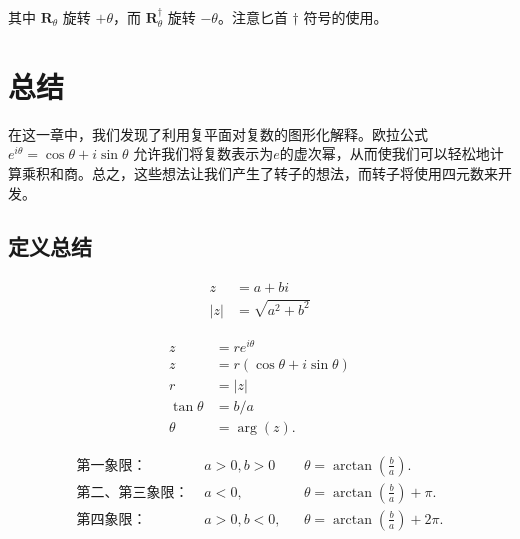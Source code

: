 其中 $\mathbf{R}_{\theta}$ 旋转 $+\theta$，而 $\mathbf{R}_{\theta}^{\dagger}$ 旋转 $-\theta$。注意匕首 $\dagger$ 符号的使用。

\section{总结}
在这一章中，我们发现了利用复平面对复数的图形化解释。欧拉公式 $e^{i \theta}=\cos \theta+i \sin \theta$ 允许我们将复数表示为$e$的虚次幂，从而使我们可以轻松地计算乘积和商。总之，这些想法让我们产生了转子的想法，而转子将使用四元数来开发。

\subsection{定义总结}
\begin{tcolorbox}[breakable, enhanced,title = {复数}]
    $$
        \begin{aligned}
            z   & =a+b i              \\
            |z| & =\sqrt{a^{2}+b^{2}}
        \end{aligned}
    $$
\end{tcolorbox}

\begin{tcolorbox}[breakable, enhanced,title = {极坐标形式}]
    $$
        \begin{aligned}
            z           & =r e^{i \theta}               \\
            z           & =r(\cos \theta+i \sin \theta) \\
            r           & =|z|                          \\
            \tan \theta & =b / a                        \\
            \theta      & =\arg (z) .
        \end{aligned}
    $$

    $$
        \begin{aligned}
            \text{第一象限：   }     & a>0, b>0  &  & \theta=\arctan \left(\frac{b}{a}\right).       \\
            \text{第二、第三象限： } & a<0,      &  & \theta=\arctan \left(\frac{b}{a}\right)+\pi.   \\
            \text{第四象限：  }      & a>0, b<0, &  & \theta=\arctan \left(\frac{b}{a}\right)+2 \pi.
        \end{aligned}
    $$
\end{tcolorbox}

